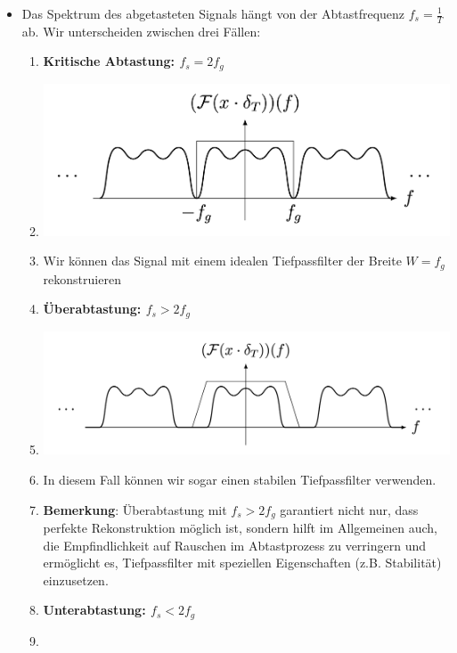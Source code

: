 \documentclass[11pt]{article}
\begin{document}
\begin{itemize}[leftmargin=0pt]
    \item[] Das Spektrum des abgetasteten Signals hängt von der Abtastfrequenz $f_s = \frac{1}{T}$ ab. Wir unterscheiden zwischen drei Fällen: \begin{enumerate}
        \item \textcolor{myblue}{\textbf{Kritische Abtastung: $f_s = 2 f_g$}}
        \item[] \begin{center}
            \includegraphics[width=0.55\linewidth]{docimgs/krit_abtast.png}
        \end{center}
        \vspace*{-0.5cm}
        \item[] Wir können das Signal mit einem idealen Tiefpassfilter der Breite $W = f_g$ rekonstruieren
        \vfill \null
        \pagebreak
        \item \textcolor{myblue}{\textbf{Überabtastung: $f_s > 2f_g$}}
        \item[] \begin{center}
            \includegraphics[width=0.65\linewidth]{docimgs/ueberabtast.png}
        \end{center}
        \vspace*{-0.5cm}
        \item[] In diesem Fall können wir sogar einen stabilen Tiefpassfilter verwenden.
        \item[] \textbf{Bemerkung}: Überabtastung mit $f_s > 2f_g$ garantiert nicht nur, dass perfekte Rekonstruktion möglich ist, sondern hilft im Allgemeinen auch, die Empfindlichkeit auf Rauschen im Abtastprozess zu verringern und ermöglicht es, Tiefpassfilter mit speziellen Eigenschaften (z.B. Stabilität) einzusetzen.
        \item \textcolor{myblue}{\textbf{Unterabtastung: $f_s < 2 f_g$}}
        \item[] \begin{center}

\end{center}
\end{enumerate}
\end{itemize}
\end{document}
